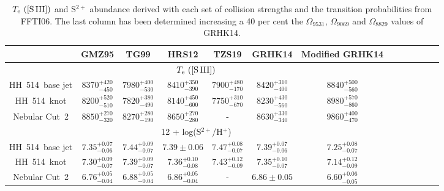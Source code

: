 \documentclass[fleqn,usenatbib]{mnras}
\begin{document}
\begin{table}
\centering
\caption{$T_{\rm e} \text{ ([S\thinspace III])}$ and S$^{2+}$ abundance derived with each set of collision strengths and the transition probabilities from FFTI06. The last column has been determined increasing a 40 per cent the  $\Omega_{9531}$, $\Omega_{9069}$ and $\Omega_{8829}$ values of GRHK14.}
\label{tab:modified_data_omega}
\begin{adjustbox}{width=\textwidth}
\begin{tabular}{ccccccccccccc}
\hline
 &  GMZ95 & TG99 & HRS12 &  TZS19 & GRHK14 & Modified GRHK14\\
\hline

\multicolumn{7}{c}{$T_{\rm e} \text{ ([S\thinspace III])}$} \\ 

HH~514~base jet  & $8370^{+420} _{-450}$ & $7980^{+400} _{-530}$ & $8410^{+350} _{-390}$ & $7900^{+480} _{-170}$ & $8420^{+310} _{-400}$ & $8840^{+500} _{-560}$ \\

HH~514~knot & $8200^{+520} _{-510}$ & $7820^{+380} _{-490}$ & $8140^{+450} _{-600}$& $7750^{+310} _{-670}$ & $8230^{+430} _{-560}$ & $8980^{+570} _{-860}$\\

Nebular Cut~2 & $8850^{+270} _{-320}$ & $8270^{+280} _{-190}$ & $8650^{+270} _{-280}$ & - & $8630^{+330} _{-340}$ & $9860^{+400} _{-470}$\\
\hline

\multicolumn{7}{c}{12 + log(S$^{2+}$/H$^{+}$)} \\

HH~514~base jet & $7.35^{+0.07} _{-0.06}$ & $7.44^{+0.09} _{-0.07}$&$7.39 \pm 0.06 $& $7.47^{+0.08} _{-0.07}$& $7.39^{+0.07} _{-0.06}$& $7.25^{+0.08} _{-0.07}$\\

HH~514~knot & $7.30^{+0.09} _{-0.07}$ & $7.39^{+0.09} _{-0.07}$& $7.36^{+0.10} _{-0.08}$& $7.43^{+0.12} _{-0.09}$ & $7.35^{+0.10} _{-0.07}$&  $7.14^{+0.12} _{-0.09}$\\

Nebular Cut~2 &$6.76^{+0.05} _{-0.04}$ &$6.88^{+0.05} _{-0.04}$ &$6.86^{+0.05} _{-0.04}$ & -& $6.86 \pm 0.05 $ & $6.60^{+0.06} _{-0.05}$ \\

\hline
\end{tabular}
\end{adjustbox}
\end{table}
\end{document}

